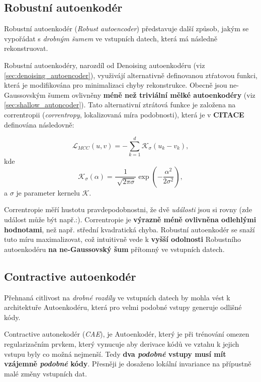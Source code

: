 \subsection{Robustní autoenkodér}
Robustní autoenkodér (\emph{Robust autoencoder}) představuje další způsob, jakým se vypořádat s \emph{drobným šumem} ve vstupních datech, která má následně rekonstruovat.


Robustní autoenkodéry, narozdíl od Denoising autoenkodéru (viz \autoref{sec:denoising_autoencoder}), využivájí alternativně definovanou ztŕatovou funkci, která je modifikována pro minimalizaci chyby rekonstrukce.
Obecně jsou ne-Gaussovským šumem ovlivněny \textbf{méně než triviální mělké autoenkodéry} (viz \autoref{sec:shallow_autoncoder}).
Tato alternativní ztrátová funkce je založena na correntropii (\emph{correntropy}, lokalizovaná míra podobnosti), která je v \textbf{CITACE} definována následovně:

\begin{equation}
    \mathcal{L}_{MCC}(u, v) = -\sum_{k=1}^{d} \mathcal{K}_\sigma(u_k - v_k),
\end{equation}
kde
\begin{equation}
    \mathcal{K}_\sigma(\alpha) = \frac{1}{\sqrt[]{2\pi\sigma}}\exp(-\frac{\alpha^2}{2\sigma^2}),
\end{equation}
a $\sigma$ je parameter kernelu $\mathcal{K}$.

Correntropie měří hustotu pravdepodobnostni, že dvě \emph{události} jsou si rovny (zde událost může být např.:).
Correntropie je \textbf{výrazně méně ovlivněna odlehlými hodnotami}, než např. střední kvadratická chyba.
Robustní autoenkodér se snaží tuto míru maximalizovat, což intuitivně vede k \textbf{vyšší odolnosti} Robustního autoenkodéru \textbf{na ne-Gaussovský šum} přítomný ve vstupních datech.

\subsection{Contractive autoenkodér}
Přehnaná citlivost na \emph{drobné rozdíly} ve vstupních datech by mohla vést k architektuře Autoenkodéru, která pro velmi podobné vstupy generuje odlišné kódy.

Contractive autonekodér (\emph{CAE}), je Autoenkodér, který je při trénování omezen regularizačním prvkem,
který vynucuje aby derivace kódů ve vztahu k jejich vstupu byly co možná nejmenší.
Tedy \textbf{dva \emph{podobné} vstupy musí mít vzájemně \emph{podobné} kódy}.
Přesněji je dosaženo lokální invariance na přípustně malé změny vstupních dat.

